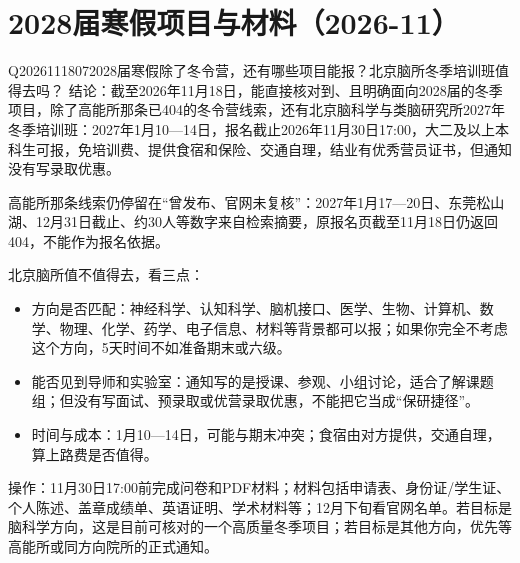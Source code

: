 \section{2028届寒假项目与材料（2026-11）}

\begin{qa}{Q2026111807}{2028届寒假除了冬令营，还有哪些项目能报？北京脑所冬季培训班值得去吗？}
结论：截至2026年11月18日，能直接核对到、且明确面向2028届的冬季项目，除了高能所那条已404的冬令营线索，还有北京脑科学与类脑研究所2027年冬季培训班：2027年1月10—14日，报名截止2026年11月30日17:00，大二及以上本科生可报，免培训费、提供食宿和保险、交通自理，结业有优秀营员证书，但通知没有写录取优惠。

高能所那条线索仍停留在“曾发布、官网未复核”：2027年1月17—20日、东莞松山湖、12月31日截止、约30人等数字来自检索摘要，原报名页截至11月18日仍返回404，不能作为报名依据。

北京脑所值不值得去，看三点：

\begin{itemize}
\item 方向是否匹配：神经科学、认知科学、脑机接口、医学、生物、计算机、数学、物理、化学、药学、电子信息、材料等背景都可以报；如果你完全不考虑这个方向，5天时间不如准备期末或六级。
\item 能否见到导师和实验室：通知写的是授课、参观、小组讨论，适合了解课题组；但没有写面试、预录取或优营录取优惠，不能把它当成“保研捷径”。
\item 时间与成本：1月10—14日，可能与期末冲突；食宿由对方提供，交通自理，算上路费是否值得。
\end{itemize}

操作：11月30日17:00前完成问卷和PDF材料；材料包括申请表、身份证/学生证、个人陈述、盖章成绩单、英语证明、学术材料等；12月下旬看官网名单。若目标是脑科学方向，这是目前可核对的一个高质量冬季项目；若目标是其他方向，优先等高能所或同方向院所的正式通知。
\end{qa}

